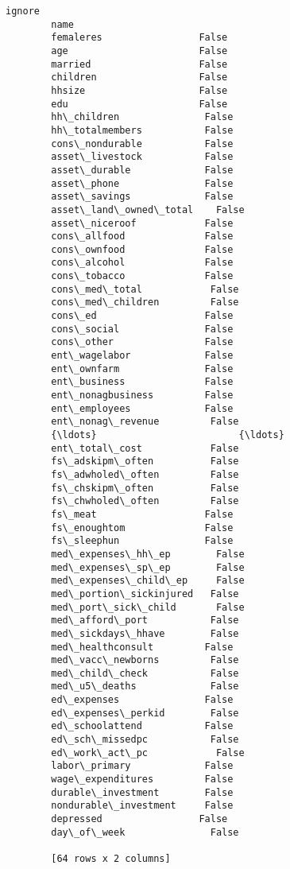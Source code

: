\documentclass[11pt]{article}
\begin{document}
\begin{Verbatim}[commandchars=\\\{\}]
                                 ignore  
        name                             
        femaleres                 False  
        age                       False  
        married                   False  
        children                  False  
        hhsize                    False  
        edu                       False  
        hh\_children               False  
        hh\_totalmembers           False  
        cons\_nondurable           False  
        asset\_livestock           False  
        asset\_durable             False  
        asset\_phone               False  
        asset\_savings             False  
        asset\_land\_owned\_total    False  
        asset\_niceroof            False  
        cons\_allfood              False  
        cons\_ownfood              False  
        cons\_alcohol              False  
        cons\_tobacco              False  
        cons\_med\_total            False  
        cons\_med\_children         False  
        cons\_ed                   False  
        cons\_social               False  
        cons\_other                False  
        ent\_wagelabor             False  
        ent\_ownfarm               False  
        ent\_business              False  
        ent\_nonagbusiness         False  
        ent\_employees             False  
        ent\_nonag\_revenue         False  
        {\ldots}                         {\ldots}  
        ent\_total\_cost            False  
        fs\_adskipm\_often          False  
        fs\_adwholed\_often         False  
        fs\_chskipm\_often          False  
        fs\_chwholed\_often         False  
        fs\_meat                   False  
        fs\_enoughtom              False  
        fs\_sleephun               False  
        med\_expenses\_hh\_ep        False  
        med\_expenses\_sp\_ep        False  
        med\_expenses\_child\_ep     False  
        med\_portion\_sickinjured   False  
        med\_port\_sick\_child       False  
        med\_afford\_port           False  
        med\_sickdays\_hhave        False  
        med\_healthconsult         False  
        med\_vacc\_newborns         False  
        med\_child\_check           False  
        med\_u5\_deaths             False  
        ed\_expenses               False  
        ed\_expenses\_perkid        False  
        ed\_schoolattend           False  
        ed\_sch\_missedpc           False  
        ed\_work\_act\_pc            False  
        labor\_primary             False  
        wage\_expenditures         False  
        durable\_investment        False  
        nondurable\_investment     False  
        depressed                 False  
        day\_of\_week               False  
        
        [64 rows x 2 columns]
\end{Verbatim}
            
\end{document}
